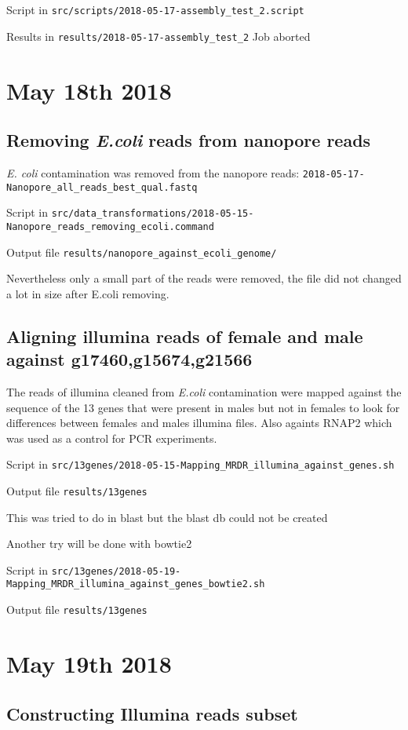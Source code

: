 \documentclass[10pt,a4paper]{article}
\begin{document}
Script in  \verb!src/scripts/2018-05-17-assembly_test_2.script!

Results in  \verb!results/2018-05-17-assembly_test_2!
Job aborted

\section{May 18th 2018}

\subsection{Removing \textit{E.coli} reads from nanopore reads}

\textit{E. coli} contamination was removed from the nanopore reads:
\verb!2018-05-17-Nanopore_all_reads_best_qual.fastq!

Script in  \verb!src/data_transformations/2018-05-15-Nanopore_reads_removing_ecoli.command!

Output file \verb!results/nanopore_against_ecoli_genome/!

Nevertheless only a small part of the reads were removed, the file did not changed a lot in size after E.coli removing.

\subsection{Aligning illumina reads of female and male against g17460,g15674,g21566}

The reads of illumina cleaned from \textit{E.coli} contamination were mapped against the sequence of the 13 genes that were present in males but not in females to look for differences between females and males illumina files. Also againts RNAP2 which was used as a control for PCR experiments.

Script in  \verb!src/13genes/2018-05-15-Mapping_MRDR_illumina_against_genes.sh!

Output file \verb!results/13genes!

This was tried to do in blast but the blast db could not be created

Another try will be done with bowtie2

Script in  \verb!src/13genes/2018-05-19-Mapping_MRDR_illumina_against_genes_bowtie2.sh!

Output file \verb!results/13genes!

\section{May 19th 2018}

\subsection{Constructing Illumina reads subset}
\end{document}
